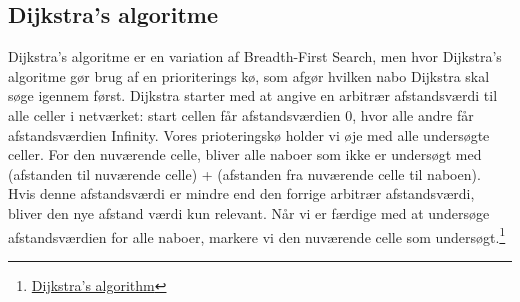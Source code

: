 \documentclass[12pt]{article}
\begin{document}
\subsection{Dijkstra’s algoritme}
Dijkstra’s algoritme er en variation af Breadth-First Search, men hvor Dijkstra’s algoritme gør brug af en prioriterings kø, som afgør hvilken nabo Dijkstra skal søge igennem først. 
Dijkstra starter med at angive en arbitrær afstandsværdi til alle celler i netværket: start cellen får afstandsværdien 0, hvor alle andre får afstandsværdien Infinity. 
Vores prioteringskø holder vi øje med alle undersøgte celler. For den nuværende celle, bliver alle naboer som ikke er undersøgt med (afstanden til nuværende celle) + (afstanden fra nuværende celle til naboen). Hvis denne afstandsværdi er mindre end den forrige arbitrær afstandsværdi, bliver den nye afstand værdi kun relevant. Når vi er færdige med at undersøge afstandsværdien for alle naboer, markere vi den nuværende celle som undersøgt.\footnote{\href{https://en.wikipedia.org/wiki/Dijkstra%27s_algorithm}{Dijkstra's algorithm}}  
\end{document}
